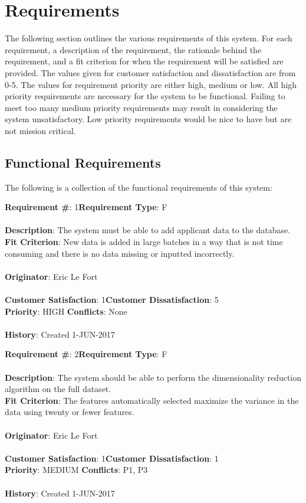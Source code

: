 \documentclass[titlepage]{article}
\begin{document}
\section{Requirements}
The following section outlines the various requirements of this system. For each requirement, a description of the requirement, the rationale behind the requirement, and a fit criterion for when the requirement will be satisfied are provided. The values given for customer satisfaction and dissatisfaction are from 0-5. The values for requirement priority are either high, medium or low. All high priority requirements are necessary for the system to be functional. Failing to meet too many medium priority requirements may result in considering the system unsatisfactory. Low priority requirements would be nice to have but are not mission critical.
\subsection{Functional Requirements}
The following is a collection of the functional requirements of this system:
\begin{framed}
	\noindent\textbf{Requirement \#}: 1\hfill \textbf{Requirement Type}: F\hfill\\\\
	\noindent\textbf{Description}: The system must be able to add applicant data to the database.\\
	\textbf{Fit Criterion}: New data is added in large batches in a way that is not time consuming and there is no data missing or inputted incorrectly.\\\\
	\textbf{Originator}: Eric Le Fort\\\\
	\noindent\textbf{Customer Satisfaction}: 1\hfill \textbf{Customer Dissatisfaction}: 5\hfill\\
	\textbf{Priority}: HIGH \hfill \textbf{Conflicts}: None\hfill\\\\
	\noindent\textbf{History}: Created 1-JUN-2017
\end{framed}
\begin{framed}
	\noindent\textbf{Requirement \#}: 2\hfill \textbf{Requirement Type}: F\hfill\\\\
	\noindent\textbf{Description}: The system should be able to perform the dimensionality reduction algorithm on the full dataset.\\
	\textbf{Fit Criterion}: The features automatically selected maximize the variance in the data using twenty or fewer features.\\\\
	\textbf{Originator}: Eric Le Fort\\\\
	\noindent\textbf{Customer Satisfaction}: 1\hfill \textbf{Customer Dissatisfaction}: 1\hfill\\
	\textbf{Priority}: MEDIUM \hfill \textbf{Conflicts}: P1, P3\hfill\\\\
	\noindent\textbf{History}: Created 1-JUN-2017
\end{framed}
\end{document}
